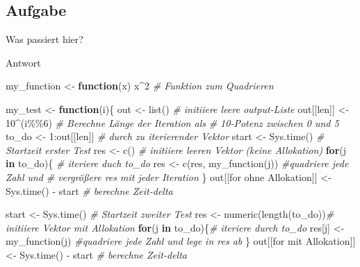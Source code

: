 \documentclass[
]{book}
\newenvironment{Shaded}{\begin{snugshade}}{\end{snugshade}}
\newcommand{\CommentTok}[1]{\textcolor[rgb]{0.56,0.35,0.01}{\textit{#1}}}
\newcommand{\ControlFlowTok}[1]{\textcolor[rgb]{0.13,0.29,0.53}{\textbf{#1}}}
\newcommand{\DecValTok}[1]{\textcolor[rgb]{0.00,0.00,0.81}{#1}}
\newcommand{\FunctionTok}[1]{\textcolor[rgb]{0.00,0.00,0.00}{#1}}
\newcommand{\NormalTok}[1]{#1}
\newcommand{\OtherTok}[1]{\textcolor[rgb]{0.56,0.35,0.01}{#1}}
\newcommand{\SpecialCharTok}[1]{\textcolor[rgb]{0.00,0.00,0.00}{#1}}
\newcommand{\StringTok}[1]{\textcolor[rgb]{0.31,0.60,0.02}{#1}}
\begin{document}
\hypertarget{aufgabe-10}{%
\subsection{Aufgabe}\label{aufgabe-10}}

Was passiert hier?

Antwort

\begin{Shaded}
\begin{Highlighting}[]
\NormalTok{my\_function }\OtherTok{\textless{}{-}} \ControlFlowTok{function}\NormalTok{(x) x}\SpecialCharTok{\^{}}\DecValTok{2} \CommentTok{\# Funktion zum Quadrieren}

\NormalTok{my\_test }\OtherTok{\textless{}{-}} \ControlFlowTok{function}\NormalTok{(i)\{}
\NormalTok{  out }\OtherTok{\textless{}{-}} \FunctionTok{list}\NormalTok{() }\CommentTok{\# initiiere leere output{-}Liste}
\NormalTok{  out[[}\StringTok{\textquotesingle{}len\textquotesingle{}}\NormalTok{]] }\OtherTok{\textless{}{-}} \DecValTok{10}\SpecialCharTok{\^{}}\NormalTok{(i}\SpecialCharTok{\%\%}\DecValTok{6}\NormalTok{) }\CommentTok{\# Berechne Länge der Iteration als }
  \CommentTok{\# 10{-}Potenz zwischen 0 und 5}
\NormalTok{  to\_do }\OtherTok{\textless{}{-}} \DecValTok{1}\SpecialCharTok{:}\NormalTok{out[[}\StringTok{\textquotesingle{}len\textquotesingle{}}\NormalTok{]] }\CommentTok{\# durch zu iterierender Vektor}
\NormalTok{  start }\OtherTok{\textless{}{-}} \FunctionTok{Sys.time}\NormalTok{() }\CommentTok{\# Startzeit erster Test}
\NormalTok{  res }\OtherTok{\textless{}{-}} \FunctionTok{c}\NormalTok{() }\CommentTok{\# initiiere leeren Vektor (keine Allokation)}
  \ControlFlowTok{for}\NormalTok{(j }\ControlFlowTok{in}\NormalTok{ to\_do)\{ }\CommentTok{\# iteriere duch to\_do}
\NormalTok{    res }\OtherTok{\textless{}{-}} \FunctionTok{c}\NormalTok{(res, }\FunctionTok{my\_function}\NormalTok{(j)) }\CommentTok{\#quadriere jede Zahl und }
    \CommentTok{\# vergrößere res mit jeder Iteration}
\NormalTok{  \}}
\NormalTok{  out[[}\StringTok{\textquotesingle{}for ohne Allokation\textquotesingle{}}\NormalTok{]] }\OtherTok{\textless{}{-}} \FunctionTok{Sys.time}\NormalTok{() }\SpecialCharTok{{-}}\NormalTok{ start }\CommentTok{\# berechne Zeit{-}delta}
  
\NormalTok{  start }\OtherTok{\textless{}{-}} \FunctionTok{Sys.time}\NormalTok{() }\CommentTok{\# Startzeit zweiter Test}
\NormalTok{  res }\OtherTok{\textless{}{-}} \FunctionTok{numeric}\NormalTok{(}\FunctionTok{length}\NormalTok{(to\_do))}\CommentTok{\# initiiere Vektor mit Allokation}
  \ControlFlowTok{for}\NormalTok{(j }\ControlFlowTok{in}\NormalTok{ to\_do)\{}\CommentTok{\# iteriere durch to\_do}
\NormalTok{    res[j] }\OtherTok{\textless{}{-}} \FunctionTok{my\_function}\NormalTok{(j) }\CommentTok{\#quadriere jede Zahl und lege in res ab}
\NormalTok{  \}}
\NormalTok{  out[[}\StringTok{\textquotesingle{}for mit Allokation\textquotesingle{}}\NormalTok{]] }\OtherTok{\textless{}{-}} \FunctionTok{Sys.time}\NormalTok{() }\SpecialCharTok{{-}}\NormalTok{ start }\CommentTok{\# berechne Zeit{-}delta}
  

\end{Highlighting}
\end{Shaded}
\end{document}

